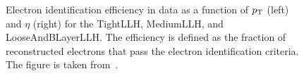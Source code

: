 \begin{figure}
  \centering
  \hspace{0.01\textwidth}
  \caption{Electron identification efficiency in data as a function of $p_{\mathrm{T}}$ (left) and $\eta$ (right) for the TightLLH, MediumLLH, and LooseAndBLayerLLH\@. The efficiency is defined as the fraction of reconstructed electrons that pass the electron identification criteria. The figure is taken from~\cite{ATLAS:EGAM-2025-04}.}\label{fig:reco_electron_id_eff}
\end{figure} 